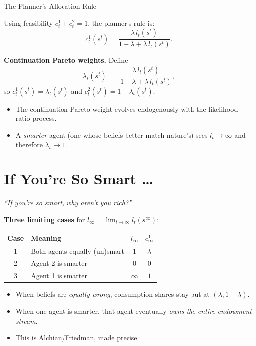 \documentclass[aspectratio=169,12pt]{beamer}
\begin{document}
\begin{frame}{The Planner's Allocation Rule}

Using feasibility $c_t^1+c_t^2=1$, the planner's rule is:
\begin{equation}\label{eq:c1star}
  \boxed{c_t^1(s^t) = \frac{\lambda\,l_t(s^t)}{1-\lambda+\lambda\,l_t(s^t)}.}
\end{equation}

\bigskip
\textbf{Continuation Pareto weights.} Define
\[
  \lambda_t(s^t) \;=\; \frac{\lambda\,l_t(s^t)}{1-\lambda+\lambda\,l_t(s^t)},
\]
so $c_t^1(s^t)=\lambda_t(s^t)$ and $c_t^2(s^t)=1-\lambda_t(s^t)$.

\bigskip
\begin{itemize}
  \item The continuation Pareto weight evolves endogenously with the
        likelihood ratio process.
  \item A \emph{smarter} agent (one whose beliefs better match nature's)
        sees $l_t\to\infty$ and therefore $\lambda_t\to 1$.
\end{itemize}

\end{frame}

\section{If You're So Smart \ldots}

\begin{frame}{\textit{``If you're so smart, why aren't you rich?''}}

\textbf{Three limiting cases} for $l_\infty = \lim_{t\to\infty} l_t(s^\infty)$:

\bigskip
\begin{center}
\renewcommand{\arraystretch}{1.5}
\begin{tabular}{clcc}
\toprule
Case & Meaning & $l_\infty$ & $c_\infty^1$ \\
\midrule
1 & Both agents equally (un)smart & $1$ & $\lambda$ \\
2 & Agent 2 is smarter & $0$ & $0$ \\
3 & Agent 1 is smarter & $\infty$ & $1$ \\
\bottomrule
\end{tabular}
\end{center}

\bigskip
\begin{itemize}
  \item When beliefs are \emph{equally wrong}, consumption shares stay put at
        $(\lambda, 1-\lambda)$.
  \item When one agent is smarter, that agent eventually \emph{owns the entire
        endowment stream}.
  \item This is Alchian/Friedman, made precise.
\end{itemize}

\end{frame}
\end{document}
